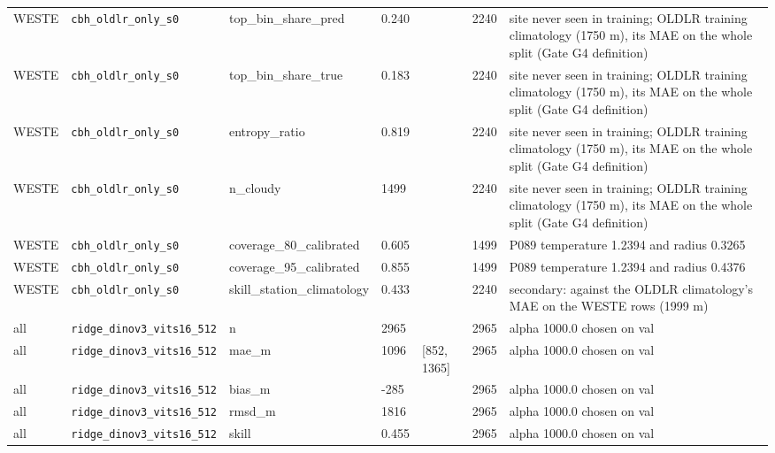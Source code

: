 \begin{center}
{\begin{tabular}{lp{2.4cm}llllp{7.3cm}}
WESTE & \texttt{cbh\_\allowbreak{}oldlr\_\allowbreak{}only\_\allowbreak{}s0} & top\_bin\_share\_pred & 0.240 &  & 2240 & site never seen in training; OLDLR training climatology (1750 m), its MAE on the whole split (Gate G4 definition) \\
WESTE & \texttt{cbh\_\allowbreak{}oldlr\_\allowbreak{}only\_\allowbreak{}s0} & top\_bin\_share\_true & 0.183 &  & 2240 & site never seen in training; OLDLR training climatology (1750 m), its MAE on the whole split (Gate G4 definition) \\
WESTE & \texttt{cbh\_\allowbreak{}oldlr\_\allowbreak{}only\_\allowbreak{}s0} & entropy\_ratio & 0.819 &  & 2240 & site never seen in training; OLDLR training climatology (1750 m), its MAE on the whole split (Gate G4 definition) \\
WESTE & \texttt{cbh\_\allowbreak{}oldlr\_\allowbreak{}only\_\allowbreak{}s0} & n\_cloudy & 1499 &  & 2240 & site never seen in training; OLDLR training climatology (1750 m), its MAE on the whole split (Gate G4 definition) \\
WESTE & \texttt{cbh\_\allowbreak{}oldlr\_\allowbreak{}only\_\allowbreak{}s0} & coverage\_80\_calibrated & 0.605 &  & 1499 & P089 temperature 1.2394 and radius 0.3265 \\
WESTE & \texttt{cbh\_\allowbreak{}oldlr\_\allowbreak{}only\_\allowbreak{}s0} & coverage\_95\_calibrated & 0.855 &  & 1499 & P089 temperature 1.2394 and radius 0.4376 \\
WESTE & \texttt{cbh\_\allowbreak{}oldlr\_\allowbreak{}only\_\allowbreak{}s0} & skill\_station\_climatology & 0.433 &  & 2240 & secondary: against the OLDLR climatology's MAE on the WESTE rows (1999 m) \\
all & \texttt{ridge\_\allowbreak{}dinov3\_\allowbreak{}vits16\_\allowbreak{}512} & n & 2965 &  & 2965 & alpha 1000.0 chosen on val \\
all & \texttt{ridge\_\allowbreak{}dinov3\_\allowbreak{}vits16\_\allowbreak{}512} & mae\_m & 1096 & [852, 1365] & 2965 & alpha 1000.0 chosen on val \\
all & \texttt{ridge\_\allowbreak{}dinov3\_\allowbreak{}vits16\_\allowbreak{}512} & bias\_m & -285 &  & 2965 & alpha 1000.0 chosen on val \\
all & \texttt{ridge\_\allowbreak{}dinov3\_\allowbreak{}vits16\_\allowbreak{}512} & rmsd\_m & 1816 &  & 2965 & alpha 1000.0 chosen on val \\
all & \texttt{ridge\_\allowbreak{}dinov3\_\allowbreak{}vits16\_\allowbreak{}512} & skill & 0.455 &  & 2965 & alpha 1000.0 chosen on val \\

\end{tabular}}
\end{center}
